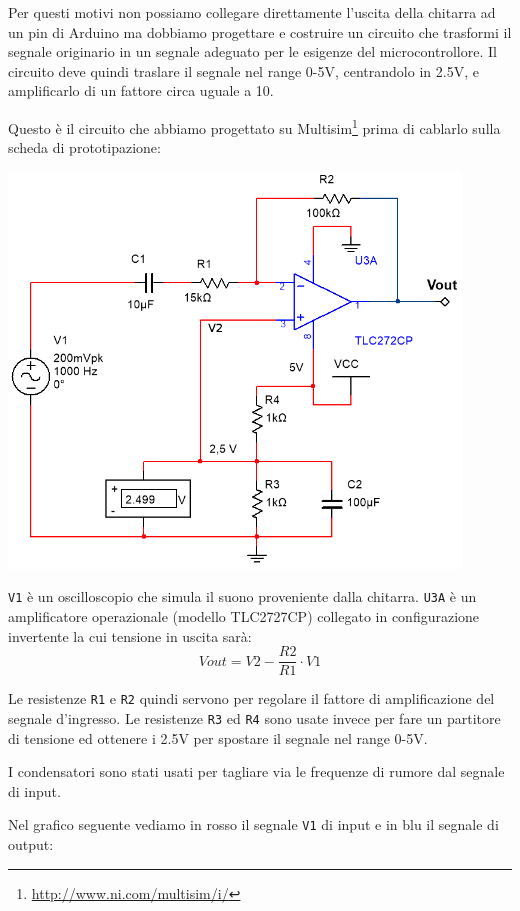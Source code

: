 \documentclass[a4paper,11pt]{article}
\begin{document}
Per questi motivi non possiamo collegare direttamente l'uscita della chitarra ad un pin di Arduino ma dobbiamo progettare e costruire un circuito che trasformi il segnale originario in un segnale adeguato per le esigenze del microcontrollore.
Il circuito deve quindi traslare il segnale nel range 0-5V, centrandolo in 2.5V, e amplificarlo di un fattore circa uguale a 10.

\newpage
Questo è il circuito che abbiamo progettato su Multisim\footnote{\url{http://www.ni.com/multisim/i/}} prima di cablarlo sulla scheda di prototipazione:

\begin{center}
\includegraphics[width=0.9\textwidth]{screen.png}
\end{center}

\texttt{V1} è un oscilloscopio che simula il suono proveniente dalla chitarra.
\texttt{U3A} è un amplificatore operazionale (modello TLC2727CP) collegato in configurazione invertente la cui tensione in uscita sarà: $$Vout = V2 - \frac{R2}{R1} \cdot V1 $$
 
Le resistenze \texttt{R1} e \texttt{R2} quindi servono per regolare il fattore di amplificazione del segnale d'ingresso. Le resistenze \texttt{R3} ed \texttt{R4} sono usate invece per fare un partitore di tensione ed ottenere i 2.5V per spostare il segnale nel range 0-5V.

I condensatori sono stati usati per tagliare via le frequenze di rumore dal segnale di input.

\vspace{0.2in}
\newpage
Nel grafico seguente vediamo in rosso il segnale \texttt{V1} di input e in blu il segnale di output:
\vspace{0.1in}
\end{document}
